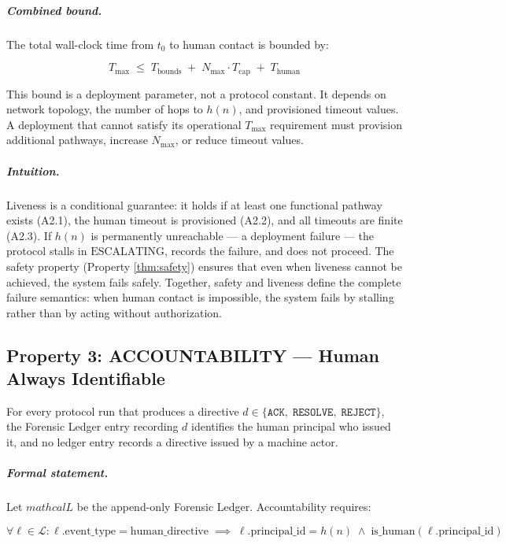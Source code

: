\subparagraph{Combined bound.} The total wall-clock time from $t_0$ to human contact is bounded by:

\begin{equation}
T_{\max} \;\leq\; T_{\text{bounds}} \;+\; N_{\max} \cdot T_{\text{cap}} \;+\; T_{\text{human}}
\end{equation}

This bound is a deployment parameter, not a protocol constant. It depends on network topology, the number of hops to $h(n)$, and provisioned timeout values. A deployment that cannot satisfy its operational $T_{\max}$ requirement must provision additional pathways, increase $N_{\max}$, or reduce timeout values.

\subparagraph{Intuition.} Liveness is a conditional guarantee: it holds if at least one functional pathway exists (A2.1), the human timeout is provisioned (A2.2), and all timeouts are finite (A2.3). If $h(n)$ is permanently unreachable — a deployment failure — the protocol stalls in $\text{ESCALATING}$, records the failure, and does not proceed. The safety property (Property \ref{thm:safety}) ensures that even when liveness cannot be achieved, the system fails safely. Together, safety and liveness define the complete failure semantics: when human contact is impossible, the system fails by stalling rather than by acting without authorization.

\subsection{Property 3: ACCOUNTABILITY — Human Always Identifiable}

\begin{theorem}\label{thm:accountability}
For every protocol run that produces a directive $d \in \{\texttt{ACK},\; \texttt{RESOLVE},\; \texttt{REJECT}\}$, the Forensic Ledger entry recording $d$ identifies the human principal who issued it, and no ledger entry records a directive issued by a machine actor.
\end{theorem}

\subparagraph{Formal statement.} Let $mathcal{L}$ be the append-only Forensic Ledger. Accountability requires:

\begin{equation}
\forall \ell \in \mathcal{L} : \ell.\text{event\_type} = \text{human\_directive}
\;\implies\;
\ell.\text{principal\_id} = h(n)
\;\land\;
\text{is\_human}(\ell.\text{principal\_id})
\end{equation}

